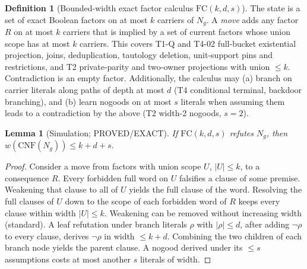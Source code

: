 \documentclass[11pt]{article}
\newtheorem{lemma}[theorem]{Lemma}
\theoremstyle{definition}
\newtheorem{definition}[theorem]{Definition}
\begin{document}
\begin{definition}[Bounded-width exact factor calculus $\mathrm{FC}(k,d,s)$]
The state is a set of exact Boolean factors on at most $k$ carriers of $N_g$. A \emph{move} adds any factor $R$ on at most $k$ carriers that is implied by a set of current factors whose union scope has at most $k$ carriers. This covers T1-Q and T4-02 full-bucket existential projection, joins, deduplication, tautology deletion, unit-support pins and restrictions, and T2 private-parity and two-owner projections with union $\le k$. Contradiction is an empty factor. Additionally, the calculus may (a) branch on carrier literals along paths of depth at most $d$ (T4 conditional terminal, backdoor branching), and (b) learn nogoods on at most $s$ literals when assuming them leads to a contradiction by the above (T2 width-2 nogoods, $s=2$).
\end{definition}

\begin{lemma}[Simulation; PROVED/EXACT]\label{lem:sim}
If $\mathrm{FC}(k,d,s)$ refutes $N_g$, then $w(\mathrm{CNF}(N_g))\le k+d+s$.
\end{lemma}
\begin{proof}
Consider a move from factors with union scope $U$, $|U|\le k$, to a consequence $R$. Every forbidden full word on $U$ falsifies a clause of some premise. Weakening that clause to all of $U$ yields the full clause of the word. Resolving the full clauses of $U$ down to the scope of each forbidden word of $R$ keeps every clause within width $|U|\le k$. Weakening can be removed without increasing width (standard). A leaf refutation under branch literals $\rho$ with $|\rho|\le d$, after adding $\neg\rho$ to every clause, derives $\neg\rho$ in width $\le k+d$. Combining the two children of each branch node yields the parent clause. A nogood derived under its $\le s$ assumptions costs at most another $s$ literals of width.
\end{proof}
\end{document}
